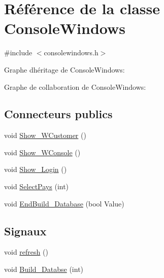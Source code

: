 \hypertarget{class_console_windows}{}\section{Référence de la classe Console\+Windows}
\label{class_console_windows}


{\ttfamily \#include $<$consolewindows.\+h$>$}



Graphe d\textquotesingle{}héritage de Console\+Windows\+:


Graphe de collaboration de Console\+Windows\+:
\subsection*{Connecteurs publics}
\begin{DoxyCompactItemize}
\item 
void \hyperlink{class_console_windows_a57b6496c34b8cca5d70b57ad1bc7c22e}{Show\+\_\+\+W\+Customer} ()
\item 
void \hyperlink{class_console_windows_a39f034fa9d01cce4b6d798c42898ffaa}{Show\+\_\+\+W\+Console} ()
\item 
void \hyperlink{class_console_windows_a20cb4e8e0ee50ebcf7ea5780bf981f64}{Show\+\_\+\+Login} ()
\item 
void \hyperlink{class_console_windows_a38cb4285810e22c1f9d900142b1369ee}{Select\+Pays} (int)
\item 
void \hyperlink{class_console_windows_a71d6a5be1d7a0764c482717cb28667c7}{End\+Build\+\_\+\+Database} (bool Value)
\end{DoxyCompactItemize}
\subsection*{Signaux}
\begin{DoxyCompactItemize}
\item 
void \hyperlink{class_console_windows_a09dbdf28f2d23c277f0e857b22e1d8af}{refresh} ()
\item 
void \hyperlink{class_console_windows_a4c9b333a871e59b32178f24ba65a3a06}{Build\+\_\+\+Databse} (int)
\end{DoxyCompactItemize}
